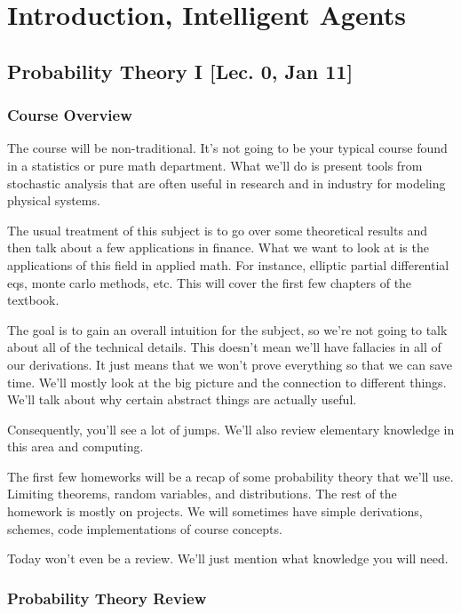 \chapter{Introduction, Intelligent Agents}

\section{Probability Theory I [Lec. 0, Jan 11]}

\subsection{Course Overview}

The course will be non-traditional. It's not going to be your typical course found in a statistics or pure math department. What we'll do is present tools from stochastic analysis that are often useful in research and in industry for modeling physical systems.

The usual treatment of this subject is to go over some theoretical results and then talk about a few applications in finance. What we want to look at is the applications of this field in applied math. For instance, elliptic partial differential eqs, monte carlo methods, etc. This will cover the first few chapters of the textbook.

The goal is to gain an overall intuition for the subject, so we're not going to talk about all of the technical details. This doesn't mean we'll have fallacies in all of our derivations. It just means that we won't prove everything so that we can save time. We'll mostly look at the big picture and the connection to different things. We'll talk about why certain abstract things are actually useful.

Consequently, you'll see a lot of jumps. We'll also review elementary knowledge in this area and computing.

The first few homeworks will be a recap of some probability theory that we'll use. Limiting theorems, random variables, and distributions. The rest of the homework is mostly on projects. We will sometimes have simple derivations, schemes, code implementations of course concepts.


Today won't even be a review. We'll just mention what knowledge you will need.

\subsection{Probability Theory Review}

